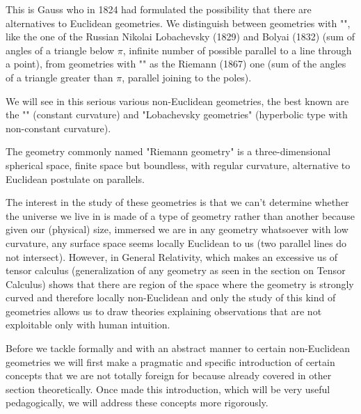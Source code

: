 	This is Gauss who in 1824 had formulated the possibility that there are alternatives to Euclidean geometries. We distinguish between geometries with "", like the one of the Russian Nikolai Lobachevsky (1829) and Bolyai (1832) (sum of angles of a triangle below $\pi$, infinite number of possible parallel to a line through a point), from geometries with "" as the Riemann (1867) one (sum of the angles of a triangle greater than $\pi$, parallel joining to the poles).
	
	We will see in this serious various non-Euclidean geometries, the best known are the "" (constant curvature) and "Lobachevsky geometries" (hyperbolic type with non-constant curvature).
	
	\begin{tcolorbox}[title=Remark,colframe=black,arc=10pt]
	The geometry commonly named "Riemann geometry" is a three-dimensional spherical space, finite space but boundless, with regular curvature, alternative to  Euclidean postulate on parallels.
	\end{tcolorbox}
	
	The interest in the study of these geometries is that we can't determine whether the universe we live in is made of a type of geometry rather than another because given our (physical) size, immersed we are in any geometry whatsoever with low curvature, any surface space seems locally Euclidean to us (two parallel lines do not intersect). However, in General Relativity, which makes an excessive us of tensor calculus (generalization of any geometry as seen in the section on Tensor Calculus) shows that there are region of the space where the geometry is strongly curved and therefore locally non-Euclidean and only the study of this kind of geometries allows us to draw theories explaining observations that are not exploitable only with human intuition.
	
	Before we tackle formally and with an abstract manner to certain non-Euclidean geometries we will first make a pragmatic and specific introduction of certain concepts that we are not totally foreign for because already covered in other section theoretically. Once made this introduction, which will be very useful pedagogically, we will address these concepts more rigorously.
	
